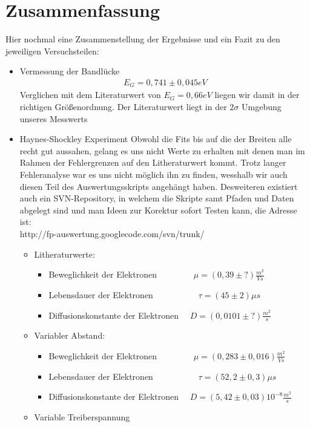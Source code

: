 \documentclass[12pt]{article}
\begin{document}
\section{Zusammenfassung}
Hier nochmal eine Zusammenstellung der Ergebnisse und ein Fazit zu den jeweiligen Versuchsteilen:
\begin{itemize}
 \item Vermessung der Bandlücke
\begin{align*}
 E_G = 0,741 \pm 0,045 eV
\end{align*}
Verglichen mit dem Literaturwert von $E_G = 0,66 eV$ liegen wir damit in der richtigen Größenordnung. Der Literaturwert liegt in der $2\sigma$ Umgebung unseres Messwerts
\item Haynes-Shockley Experiment
Obwohl die Fits bis auf die der Breiten alle recht gut aussahen, gelang es uns nicht Werte zu erhalten mit denen man im Rahmen der Fehlergrenzen auf den Litheraturwert kommt. Trotz langer Fehleranalyse war es uns nicht möglich ihn zu finden, wesshalb wir auch diesen Teil des Auswertungsskripts angehängt haben. Desweiteren existiert auch ein SVN-Repository, in welchem die Skripte samt Pfaden und Daten abgelegt sind und man Ideen zur Korektur sofort Testen kann, die Adresse ist: \\ http://fp-auswertung.googlecode.com/svn/trunk/
\begin{itemize}
\item Litheraturwerte:
\begin{itemize}
 \item Beweglichkeit der Elektronen ~~~~~~~~$\mu = (0,39 \pm ?) \frac{m^2}{Vs}$ 
 \item Lebensdauer der Elektronen ~~~~~~~~~~$\tau = (45 \pm 2) \mu s $
 \item Diffusionskonstante der Elektronen ~~$D = (0,0101 \pm ?) \frac{m^2}{s}$
\end{itemize}
\item Variabler Abstand:
\begin{itemize}
 \item Beweglichkeit der Elektronen ~~~~~~~~$\mu = (0,283 \pm 0,016) \frac{m^2}{Vs}$ 
 \item Lebensdauer der Elektronen ~~~~~~~~~~$\tau = (52,2 \pm 0,3) \mu s $
 \item Diffusionskonstante der Elektronen ~~$D = (5,42 \pm 0,03) 10^{-8} \frac{m^2}{s}$
\end{itemize}
\item Variable Treiberspannung
\begin{itemize}

\end{itemize}
\end{itemize}
\end{itemize}
\end{document}
